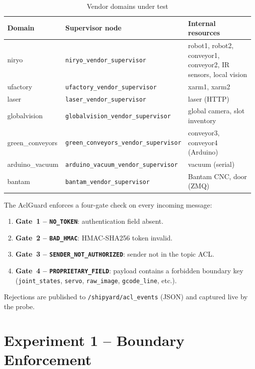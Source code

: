 \documentclass[11pt,a4paper]{article}
\begin{document}
\begin{table}[h]
\centering
\caption{Vendor domains under test}
\label{tab:vendors}
\begin{tabular}{@{}llp{6.5cm}@{}}
\toprule
\textbf{Domain} & \textbf{Supervisor node} & \textbf{Internal resources} \\
\midrule
niryo           & \texttt{niryo\_vendor\_supervisor}          & robot1, robot2, conveyor1, conveyor2, IR sensors, local vision \\
ufactory        & \texttt{ufactory\_vendor\_supervisor}       & xarm1, xarm2 \\
laser           & \texttt{laser\_vendor\_supervisor}         & laser (HTTP) \\
globalvision    & \texttt{globalvision\_vendor\_supervisor}   & global camera, slot inventory \\
green\_conveyors& \texttt{green\_conveyors\_vendor\_supervisor}& conveyor3, conveyor4 (Arduino) \\
arduino\_vacuum & \texttt{arduino\_vacuum\_vendor\_supervisor}& vacuum (serial) \\
bantam          & \texttt{bantam\_vendor\_supervisor}        & Bantam CNC, door (ZMQ) \\
\bottomrule
\end{tabular}
\end{table}

The AclGuard enforces a four-gate check on every incoming message:

\begin{enumerate}
  \item \textbf{Gate~1 -- \texttt{NO\_TOKEN}}: authentication field absent.
  \item \textbf{Gate~2 -- \texttt{BAD\_HMAC}}: HMAC-SHA256 token invalid.
  \item \textbf{Gate~3 -- \texttt{SENDER\_NOT\_AUTHORIZED}}: sender not in the
    topic ACL.
  \item \textbf{Gate~4 -- \texttt{PROPRIETARY\_FIELD}}: payload contains a
    forbidden boundary key (\texttt{joint\_states}, \texttt{servo},
    \texttt{raw\_image}, \texttt{gcode\_line}, etc.).
\end{enumerate}

Rejections are published to \texttt{/shipyard/acl\_events} (JSON) and
captured live by the probe.

\section{Experiment 1 -- Boundary Enforcement}
\end{document}
